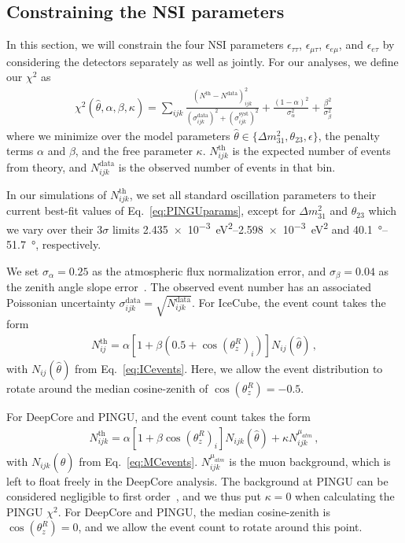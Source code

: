 \documentclass[draft=True]{revtex4-2}
\newcommand{\zreco}{\ensuremath{\cos{(\theta_z^{R})}}}
\newcommand{\emt}{\ensuremath{\epsilon_{\mu\tau}}}
\newcommand{\eet}{\epsilon_{e\tau}}
\newcommand{\eem}{\epsilon_{e\mu}}
\newcommand{\ett}{\ensuremath{\epsilon_{\tau\tau}}}
\newcommand{\dm}{\Delta m^2_{31}}
\begin{document}
\subsection{Constraining the NSI parameters}\label{sec:constraining}
In this section, we will constrain the four NSI parameters $\ett$, $\emt$, $\eem$, and $\eet$ by considering the detectors separately as well as jointly.
For our analyses, we define our $\chi^2$ as
\begin{align} \label{eq:chisq}
    \chi^{2}(\hat{\theta},\alpha,\beta, \kappa)=\sum_{ijk} \frac{\left(N^\text{th}-N^\text{data}\right)_{ijk}^{2}}
    {\left(\sigma^\text{data}_{ijk}\right)^{2} + \left(\sigma^\text{syst}_{ijk}\right)^{2}}+ 
    \frac{(1-\alpha)^2}{\sigma_\alpha^2} + \frac{\beta^2}{\sigma_\beta^2}\,
\end{align}
where we minimize over the model parameters $\hat{\theta} \in \{\dm, \theta_{23}, \epsilon\}$, the penalty terms $\alpha$ and $\beta$, and the free parameter $\kappa$.
$N_{ijk}^\text{th}$ is the expected number of events from theory, and $N_{ijk}^\text{data}$ is the observed number of events in that bin. 

In our simulations of $N_{ijk}^\text{th}$, we set all standard oscillation parameters to their current best-fit values of Eq.~\ref{eq:PINGUparams}, 
except for $\dm$ and $\theta_{23}$
which we vary over their $3\sigma$ limits \SIrange{2.435e-3}{2.598e-3}{\eV \squared} and \SIrange{40.1}{51.7}{\degree}, respectively.

We set $\sigma_\alpha = 0.25$ as the atmospheric flux normalization error, and $\sigma_\beta = 0.04$ as the zenith angle slope error~\cite{hondapaper}. 
The observed event number has an associated Poissonian uncertainty $\sigma_{ijk}^\text{data} = \sqrt{N_{ijk}^\text{data}}$.
For IceCube, the event count takes the form
\begin{align}
    N^\text{th}_{ij} = \alpha\left[1+\beta (0.5 + \zreco_i )\right] N_{ij}(\hat{\theta})\,,
\end{align}
with $N_{ij}(\hat{\theta})$ from Eq.~\ref{eq:ICevents}. Here, we allow the event distribution to rotate around the median cosine-zenith of $\zreco = -0.5$.

For DeepCore and PINGU, and the event count takes the form
\begin{align}
    N^\text{th}_{ijk} = \alpha\left[1+\beta \zreco_i \right] N_{ijk}(\hat{\theta}) + \kappa N_{ijk}^{\mu_{atm}}\,,
\end{align}
with $N_{ijk}(\hat{\theta})$ from Eq.~\ref{eq:MCevents}. $N_{ijk}^{\mu_{atm}}$ is the muon background, which is left to float freely in the DeepCore analysis.
The background at PINGU can be considered negligible to first order~\cite{PINGUdata}, and we thus put $\kappa=0$ when calculating the PINGU $\chi^2$.
For DeepCore and PINGU, the median cosine-zenith is $\zreco = 0$, and we allow the event count to rotate around this point.
\end{document}
